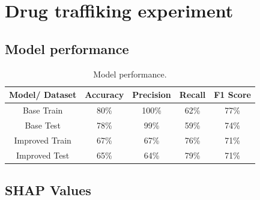 \documentclass[twoside,11pt]{article}
\begin{document}
\vskip 0.2in



\clearpage

\appendix
\section{Drug traffiking experiment}

\subsection{Model performance}

\begin{table}[!htb]
\centering
\begin{tabular}{|c|c|c|c|c|}
\hline

\textbf{Model/ Dataset} & \textbf{Accuracy} & \textbf{Precision} & \textbf{Recall} & \textbf{F1 Score} \\ \hline
     Base Train &     80\% &     100\% &   62\% &     77\% \\
      Base Test &     78\% &     99\% &   59\% &     74\% \\
Improved Train &     67\% &      67\% &   76\% &     71\% \\
 Improved Test &     65\% &      64\% &   79\% &     71\% \\

\hline
\end{tabular}
\caption{Model performance.}
\end{table}


\subsection{SHAP Values}
\end{document}
